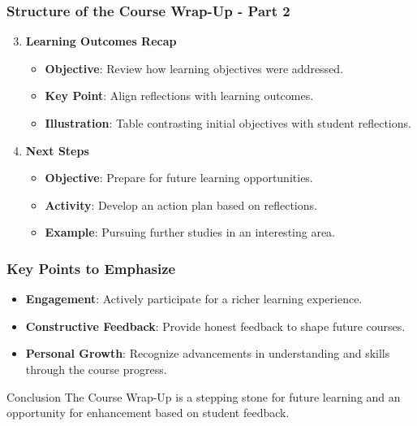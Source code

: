 \documentclass[aspectratio=169]{beamer}
\begin{document}
\begin{frame}[fragile]
    \frametitle{Structure of the Course Wrap-Up - Part 2}
    \begin{enumerate}
        \setcounter{enumi}{2} %
        \item \textbf{Learning Outcomes Recap}
            \begin{itemize}
                \item \textbf{Objective}: Review how learning objectives were addressed.
                \item \textbf{Key Point}: Align reflections with learning outcomes.
                \item \textbf{Illustration}: Table contrasting initial objectives with student reflections.
            \end{itemize}
        \item \textbf{Next Steps}
            \begin{itemize}
                \item \textbf{Objective}: Prepare for future learning opportunities.
                \item \textbf{Activity}: Develop an action plan based on reflections.
                \item \textbf{Example}: Pursuing further studies in an interesting area.
            \end{itemize}
    \end{enumerate}
\end{frame}

\begin{frame}[fragile]
    \frametitle{Key Points to Emphasize}
    \begin{itemize}
        \item \textbf{Engagement}: Actively participate for a richer learning experience.
        \item \textbf{Constructive Feedback}: Provide honest feedback to shape future courses.
        \item \textbf{Personal Growth}: Recognize advancements in understanding and skills through the course progress.
    \end{itemize}

    \begin{block}{Conclusion}
        The Course Wrap-Up is a stepping stone for future learning and an opportunity for enhancement based on student feedback.
    \end{block}
\end{frame}
\end{document}
